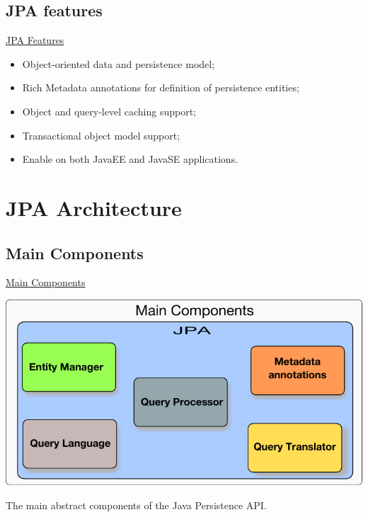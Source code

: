 \documentclass[xcolor=x11names,compress]{beamer}
\renewcommand{\(}{\begin{columns}}
\renewcommand{\)}{\end{columns}}
\newcommand{\<}[1]{\begin{column}{#1}}
\renewcommand{\>}{\end{column}}
\begin{document}
\subsection{JPA features}
\begin{frame}{\underline{JPA Features}}

\begin{itemize}
\itemsep 12pt
\justifying

 \item Object-oriented data and persistence model; 

\item Rich Metadata annotations for definition of persistence entities;

\item Object and query-level caching support;

\item Transactional object model support;

\item Enable on both JavaEE and JavaSE applications.

\end{itemize}

\end{frame}

\section{JPA Architecture}
\subsection{Main Components}
\begin{frame}{\underline{Main Components}}

\begin{center}
\includegraphics[keepaspectratio,width=.8\textwidth]{JPA-mainComponents}

The main abstract components of the Java Persistence API.
\end{center}
\end{frame}
\end{document}
